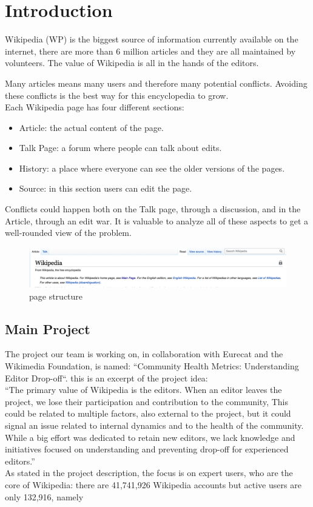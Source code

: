 \chapter{Introduction}
Wikipedia (WP) is the biggest source of information currently available on the internet, there are more
than 6 million articles and they are all maintained by volunteers. The value of Wikipedia is all in
the hands of the editors.

Many articles means many users and therefore many potential conflicts. Avoiding these conflicts is
the best way for this encyclopedia to grow. \\ 
Each Wikipedia page has four different sections:  
\begin{itemize}
    \item Article: the actual content of the page.
    \item Talk Page: a forum where people can talk about edits. 
    \item History: a place where everyone can see the older versions of the pages.
    \item Source: in this section users can edit the page. 
\end{itemize}

Conflicts could happen both on the Talk page, through a discussion, and in the Article, through an
edit war. It is valuable to analyze all of these aspects to get a well-rounded view of the problem.

\begin{figure}
    \centering
    \includegraphics[width=1\textwidth]{./chapters/01/assets/wikipedia_page.png}
    \caption{page structure}
    \label{fig:page}
\end{figure}

\section{Main Project}
\label{sec:Main Project}
The project our team is working on, in collaboration with Eurecat and the Wikimedia Foundation,
is named: “Community Health Metrics: Understanding Editor Drop-off“. this is an excerpt of the
project idea: \\

“The primary value of Wikipedia is the editors. When an editor leaves the project, we lose their
participation and contribution to the community, This could be related to multiple factors, also
external to the project, but it could signal an issue related to internal dynamics and to the health
of the community. While a big effort was dedicated to retain new editors, we lack knowledge and
initiatives focused on understanding and preventing drop-off for experienced editors.”
\\
As stated in the project description, the focus is on expert users, who are the core of Wikipedia:
there are 41,741,926 Wikipedia accounts but active users are only 132,916, namely%

